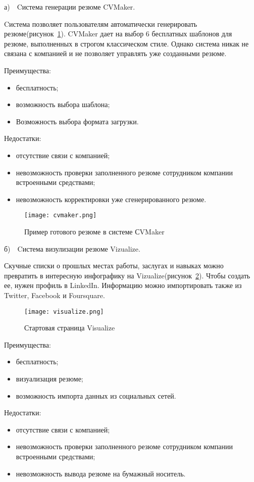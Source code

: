 а)~~Cистема генерации резюме CVMaker.

Cистема позволяет пользователям автоматически генерировать резюме(рисунок~\ref{fig:analysis:analogues:cvmaker}).
CVMaker дает на выбор 6 бесплатных шаблонов для резюме, выполненных в строгом классическом стиле. Однако система никак
не связана с компанией и не позволяет управлять уже созданными резюме.

Преимущества:
\begin{itemize}
	\item бесплатность;
	\item возможность выбора шаблона;
	\item Возможность выбора формата загрузки.
\end{itemize}

Недостатки:
\begin{itemize}
	\item отсутствие связи с компанией;
	\item невозможность проверки заполненного резюме сотрудником компании встроенными средствами;
	\item невозможность корректировки уже сгенерированного резюме.
\end{itemize}

\begin{figure}[!t]
	\centering
	\texttt{[image: cvmaker.png]} 
	\caption{Пример готового резюме в системе СVMaker}
	\label{fig:analysis:analogues:cvmaker}
\end{figure}

б)~~Cистема визулизации резюме Vizualize.

Скучные списки о прошлых местах работы, заслугах и навыках можно превратить в интересную инфографику на
Vizualize(рисунок~\ref{fig:analysis:analogues:visualize}). Чтобы создать ее, нужен профиль в LinkedIn. Информацию можно
импортировать также из Twitter, Facebook и Foursquare.

\begin{figure}[!t]
	\centering
	\texttt{[image: visualize.png]} 
	\caption{Стартовая страница Visualize}
	\label{fig:analysis:analogues:visualize}
\end{figure}

Преимущества:
\begin{itemize}
	\item бесплатность;
	\item визуализация резюме;
	\item возможность импорта данных из социальных сетей.
\end{itemize}

Недостатки:
\begin{itemize}
	\item отсутствие связи с компанией;
	\item невозможность проверки заполненного резюме сотрудником компании встроенными средствами;
	\item невозможность вывода резюме на бумажный носитель.
\end{itemize}
